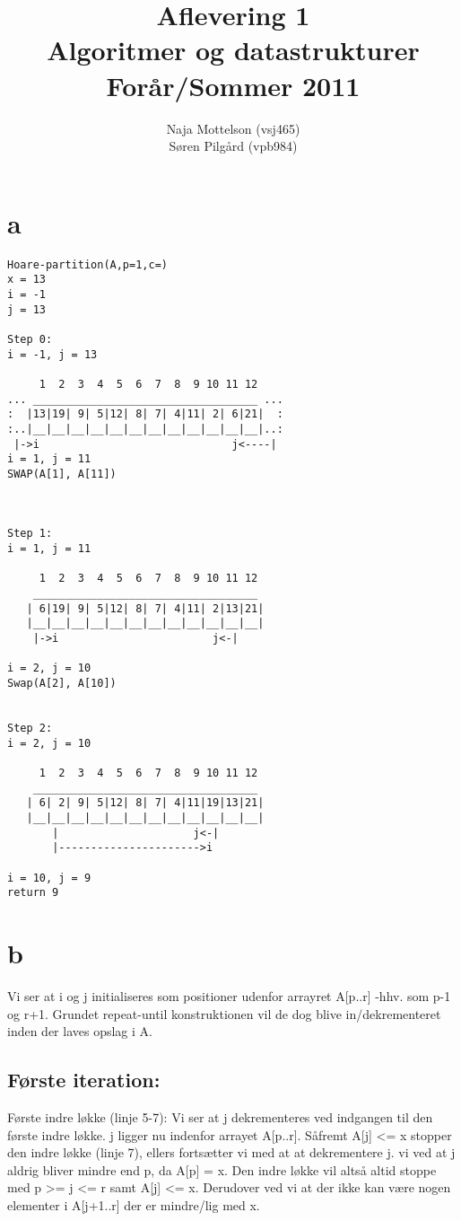 \documentclass[10pt,a4paper,danish]{article}
\title{Aflevering 1 \\Algoritmer og datastrukturer\\Forår/Sommer 2011}
\author{Naja Mottelson (vsj465)\\Søren Pilgård (vpb984)}
\begin{document}
\maketitle
\newpage

\tableofcontents
\newpage

\section{a}
\begin{verbatim}
Hoare-partition(A,p=1,c=)
x = 13
i = -1
j = 13

Step 0:
i = -1, j = 13

     1  2  3  4  5  6  7  8  9 10 11 12
... ___________________________________ ...
:  |13|19| 9| 5|12| 8| 7| 4|11| 2| 6|21|  :
:..|__|__|__|__|__|__|__|__|__|__|__|__|..:
 |->i                              j<----|
i = 1, j = 11
SWAP(A[1], A[11])



Step 1:
i = 1, j = 11

     1  2  3  4  5  6  7  8  9 10 11 12
    ___________________________________ 
   | 6|19| 9| 5|12| 8| 7| 4|11| 2|13|21|
   |__|__|__|__|__|__|__|__|__|__|__|__|
    |->i                        j<-|

i = 2, j = 10
Swap(A[2], A[10])


Step 2:
i = 2, j = 10

     1  2  3  4  5  6  7  8  9 10 11 12
    ___________________________________ 
   | 6| 2| 9| 5|12| 8| 7| 4|11|19|13|21|
   |__|__|__|__|__|__|__|__|__|__|__|__|
       |                     j<-|
       |---------------------->i

i = 10, j = 9
return 9

\end{verbatim}
\section{b}
Vi ser at i og j initialiseres som positioner udenfor arrayret A[p..r] -hhv. som p-1 og r+1.
Grundet repeat-until konstruktionen vil de dog blive in/dekrementeret inden der laves opslag i A.

\subsection{Første iteration:}
\label{sec:foerste-it}
Første indre løkke (linje 5-7):
Vi ser at j dekrementeres ved indgangen til den første indre løkke. j ligger nu indenfor arrayet A[p..r]. 
Såfremt A[j] <= x stopper den indre løkke (linje 7), ellers fortsætter vi med at at dekrementere j.
vi ved at j aldrig bliver mindre end p, da A[p] = x. Den indre løkke vil altså altid stoppe med p >= j <= r samt A[j] <= x.
Derudover ved vi at der ikke kan være nogen elementer i A[j+1..r] der er mindre/lig med x.
 
\end{document}
